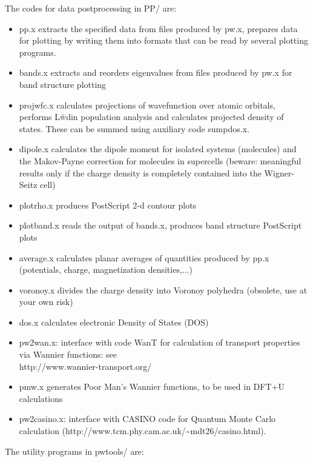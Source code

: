 \documentclass[12pt,a4paper]{article}
\begin{document}
The codes for data postprocessing in PP/ are:
\begin{itemize}
\item pp.x extracts the specified data from files produced by pw.x,
  prepares data for plotting by writing them into formats that can be
  read by several plotting programs. 
\item bands.x extracts and reorders eigenvalues from files produced by
  pw.x for band structure plotting 
\item projwfc.x calculates projections of wavefunction over atomic
  orbitals, performs L\"wdin population analysis and calculates
  projected density of states. These can be summed using auxiliary
  code sumpdos.x. 
\item dipole.x calculates the dipole moment for isolated systems
  (molecules) and the Makov-Payne correction for molecules in
  supercells (beware: meaningful results only if the charge density is
  completely contained into the Wigner-Seitz cell) 
\item plotrho.x produces PostScript 2-d contour plots
\item plotband.x reads the output of bands.x, produces band structure
  PostScript plots
\item average.x calculates planar averages of quantities produced by
  pp.x (potentials, charge, magnetization densities,...) 
\item voronoy.x divides the charge density into Voronoy polyhedra
  (obsolete, use at your own risk) 
\item dos.x calculates electronic Density of States (DOS)
\item pw2wan.x: interface with code WanT for calculation of transport
  properties via Wannier functions: see \\
  http://www.wannier-transport.org/ 
\item pmw.x generates Poor Man's Wannier functions, to be used in
  DFT+U calculations 
\item pw2casino.x: interface with CASINO code for Quantum Monte Carlo
  calculation (http://www.tcm.phy.cam.ac.uk/\~{}mdt26/casino.html). 
\end{itemize}
The utility programs in pwtools/ are:
\end{document}
